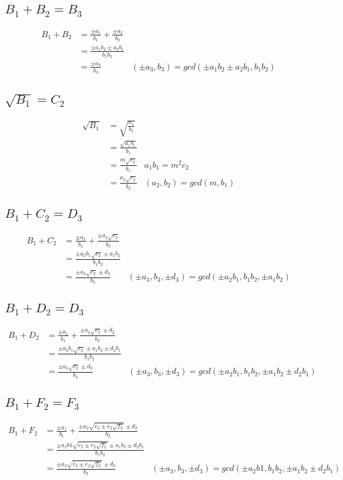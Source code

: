 \documentclass{article}
\begin{document}
\subsection{$B_1 + B_2 = B_3$}
\begin{align*}
B_1 + B_2 &= \frac{\pm a_1}{b_1} + \frac{\pm a_2}{b_2} \\
 &= \frac{\pm a_1b_2 \pm a_2b_1 }{b_1b_2} \\
 &= \frac{\pm a_3}{b_3} & (\pm a_3,b_3) = gcd(\pm a_1b_2 \pm a_2b_1, b_1b_2)
\end{align*}

\subsection{$\sqrt{B_1} = C_2$}
\begin{align*}
\sqrt{B_1} &= \sqrt{\frac{a_1}{b_1}}\\
  &= \frac{\sqrt{a_1b_1}}{b_1}\\
  &= \frac{m\sqrt{c_2}}{b_1}    & a_1b_1 = m^2c_2\\
  &= \frac{a_2\sqrt{c_2}}{b_2}  & (a_2, b_2) = gcd(m, b_1)
\end{align*}

\subsection{$B_1 + C_2 = D_3$}
\begin{align*}
B_1 + C_2 &= \frac{\pm a_1}{b_1} + \frac{\pm a_2\sqrt{c_2}}{b_2}\\
 &= \frac{\pm a_2b_1\sqrt{c_2} \pm a_1b_2 }{b_1b_2}\\
 &= \frac{\pm a_3\sqrt{c_2} \pm d_3 }{b_3} & (\pm a_3, b_3, \pm d_3) = gcd(\pm a_2b_1,b_1b_2,\pm a_1b_2)
\end{align*}

\subsection{$B_1 + D_2 = D_3$}
\begin{align*}
B_1 + D_2 &= \frac{\pm a_1}{b_1} + \frac{\pm a_2\sqrt{c_2} \pm d_2}{b_2}\\
 &= \frac{\pm a_2b_1\sqrt{c_2} \pm a_1b_2 \pm d_2b_1 }{b_1b_2}\\
 &= \frac{\pm a_3\sqrt{c_2} \pm d_3 }{b_3} & (\pm a_3, b_3, \pm d_3) = gcd(\pm a_2b_1,b_1b_2,\pm a_1b_2 \pm d_2b_1)
\end{align*}

\subsection{$B_1 + F_2 = F_3$} %
\begin{align*}
B_1 + F_2 &= \frac{\pm a_1}{b_1} + \frac{\pm a_2\sqrt{c_2 \pm e_2\sqrt{f_2}} \pm d_2}{b_2}\\
 &= \frac{\pm a_2b1\sqrt{c_2 \pm e_2\sqrt{f_2}} \pm a_1b_2 \pm d_2b_1}{b_1b_2}\\
 &= \frac{\pm a_3\sqrt{c_2 \pm e_2\sqrt{f_2}} \pm d_3}{b_3} & (\pm a_3, b_3, \pm d_3)=gcd(\pm a_2b1,b_1b_2,\pm a_1b_2 \pm d_2b_1)
\end{align*}
\end{document}
